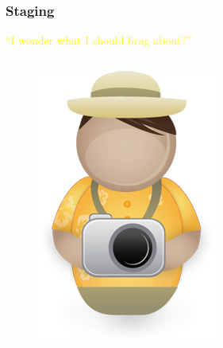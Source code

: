 \documentclass[glossy]{beamer}
\begin{document}
\begin{frame}[fragile=singleslide]
  \frametitle{Staging}

  \textcolor{yellow}{\enquote{I wonder what I should brag about?}}
  \begin{columns}
    \begin{column}{4cm}
      \begin{figure}
        \centering
        \includegraphics[width=0.9\columnwidth]{tourist}
      \end{figure}

    \end{column}

    \begin{column}{8cm}
      \begin{figure}
        \centering
        
      \end{figure}
    \end{column}
  \end{columns}

\end{frame}
\end{document}

